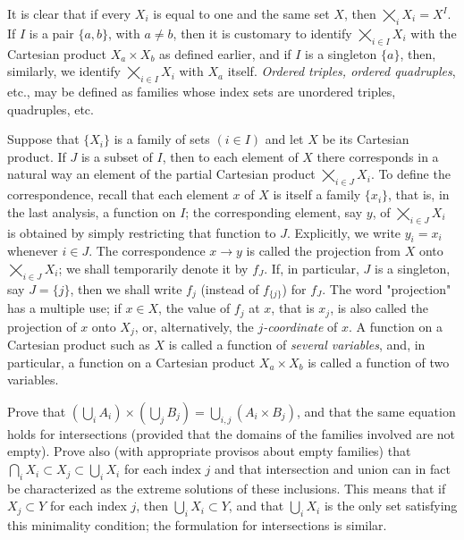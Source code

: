 It is clear that if every $X_{i}$ is equal to one and the same set $X$, then $\bigtimes_{i}X_{i} = X^{I}$. If $I$ is a pair $\{ a,b \}$, with $a \neq b$, then it is customary to identify $\bigtimes_{i \in I}X_{i}$ with the Cartesian product $X_{a} \times X_{b}$ as defined earlier, and if $I$ is a singleton $\{ a \}$, then, similarly, we identify $\bigtimes_{i \in I}X_{i}$ with $X_{a}$ itself. \textit{Ordered triples, ordered quadruples}, etc., may be defined as families whose index sets are unordered triples, quadruples, etc. 

Suppose that $\{ X_{i} \}$ is a family of sets $(i \in I)$ and let $X$ be its Cartesian product. If $J$ is a subset of $I$, then to each element of $X$ there corresponds in a natural way an element of the partial Cartesian product $\bigtimes_{i \in J}X_{i}$. To define the correspondence, recall that each element $x$ of $X$ is itself a family $\{ x_{i} \}$, that is, in the last analysis, a function on $I$; the corresponding element, say $y$, of $\bigtimes_{i \in J}X_{i}$ is obtained by simply restricting that function to $J$. Explicitly, we write $y_{i} = x_{i}$ whenever $i \in J$. The correspondence $x \rightarrow y$ is called the projection from $X$ onto $\bigtimes_{i \in J}X_{i}$; we shall temporarily denote it by $f_{J}$. If, in particular, $J$ is a singleton, say $J = \{ j \}$, then we shall write $f_{j}$ (instead of $f_{ \{j \} }$) for $f_{J}$. The word "projection" has a multiple use; if $x \in X$, the value of $f_{j}$ at $x$, that is $x_{j}$, is also called the projection of $x$ onto $X_{j}$, or, alternatively, the \textit{$j$-coordinate} of $x$. A function on a Cartesian product such as $X$ is called a function of \textit{several variables}, and, in particular, a function on a Cartesian product $X_{a} \times X_{b}$ is called a function of two variables. 

\begin{exercise} Prove that $(\bigcup_{i}A_{i}) \times (\bigcup_{j}B_{j}) = \bigcup_{i,j}(A_{i} \times B_{j})$, and that the same equation holds for intersections (provided that the domains of the families involved are not empty). Prove also (with appropriate provisos about empty families) that $\bigcap_{i}X_{i} \subset X_{j} \subset \bigcup_{i}X_{i}$ for each index $j$ and that intersection and union can in fact be characterized as the extreme solutions of these inclusions. This means that if $X_{j} \subset Y$ for each index $j$, then $\bigcup_{i}X_{i} \subset Y$, and that $\bigcup_{i}X_{i}$ is the only set satisfying this minimality condition; the formulation for intersections is similar.
\end{exercise}